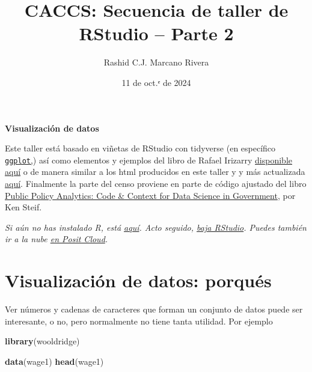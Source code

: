 \documentclass[
]{article}
\title{CACCS: Secuencia de taller de RStudio -- Parte 2}
\author{Rashid C.J. Marcano Rivera}
\date{11 de oct.ᵉ de 2024}
\newenvironment{Shaded}{\begin{snugshade}}{\end{snugshade}}
\newcommand{\FunctionTok}[1]{\textcolor[rgb]{0.13,0.29,0.53}{\textbf{#1}}}
\newcommand{\NormalTok}[1]{#1}
\begin{document}
\maketitle

{
\setcounter{tocdepth}{2}
\tableofcontents
}
\textbf{Visualización de datos}

Este taller está basado en viñetas de RStudio con tidyverse (en
específico \href{https://ggplot2.tidyverse.org}{\texttt{ggplot},}) así
como elementos y ejemplos del libro de Rafael Irizarry
\href{https://leanpub.com/dslibro}{disponible aquí} o de manera similar
a los html producidos en este taller y y más actualizada
\href{https://rafalab.dfci.harvard.edu/dslibro/}{aquí}. Finalmente la
parte del censo proviene en parte de código ajustado del libro
\href{https://urbanspatial.github.io/PublicPolicyAnalytics/introduction.html}{Public
Policy Analytics: Code \& Context for Data Science in Government}, por
Ken Steif.

\emph{Si aún no has instalado R, está
\href{http://cran.us.r-project.org/}{aquí}. Acto seguido,
\href{https://posit.co/download/rstudio-desktop/}{baja RStudio}. Puedes
también ir a la nube \href{https://posit.cloud/}{en Posit Cloud}.}

\section{Visualización de datos:
porqués}\label{visualizaciuxf3n-de-datos-porquuxe9s}

Ver números y cadenas de caracteres que forman un conjunto de datos
puede ser interesante, o no, pero normalmente no tiene tanta utilidad.
Por ejemplo

\begin{Shaded}
\begin{Highlighting}[]
\FunctionTok{library}\NormalTok{(wooldridge)}

\FunctionTok{data}\NormalTok{(wage1)}
\FunctionTok{head}\NormalTok{(wage1)}
\end{Highlighting}
\end{Shaded}
\end{document}
